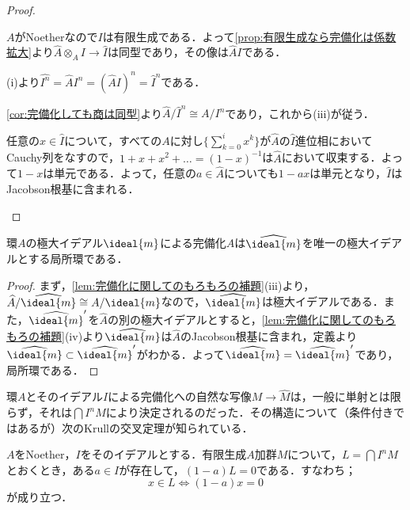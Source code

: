 \begin{proof}
	\begin{sakura}
		\item $A$がNoetherなので$I$は有限生成である．よって\ref{prop:有限生成なら完備化は係数拡大}より$\widehat{A}\otimes_A I\to\widehat{I}$は同型であり，その像は$\widehat{A}I$である．
		
		\item (i)より$\widehat{I^n}=\widehat{A}I^n=(\widehat{A}I)^n=\widehat{I}^n$である．
		
		\item \ref{cor:完備化しても商は同型}より$\widehat{A}/\widehat{I}^n\cong A/I^n$であり，これから(iii)が従う．
		
		\item 任意の$x\in\widehat{I}$について，すべての$A$に対し$\{\sum_{k=0}^i x^k\}$が$\widehat{A}$の$\widehat{I}$進位相においてCauchy列をなすので，$1+x+x^2+\dots=(1-x)^{-1}$は$\widehat{A}$において収束する．よって$1-x$は単元である．よって，任意の$a\in\widehat{A}$についても$1-ax$は単元となり，$\widehat{I}$はJacobson根基に含まれる．
	\end{sakura}
\end{proof}

\begin{prop}
	環$A$の極大イデアル$\ideal{m}$による完備化$\widehat{A}$は$\widehat{\ideal{m}}$を唯一の極大イデアルとする局所環である．
\end{prop}

\begin{proof}
	まず，\ref{lem:完備化に関してのもろもろの補題}(iii)より，$\widehat{A}/\widehat{\ideal{m}}\cong A/\ideal{m}$なので，$\widehat{\ideal{m}}$は極大イデアルである．また，$\widehat{\ideal{m}}'$を$\widehat{A}$の別の極大イデアルとすると，\ref{lem:完備化に関してのもろもろの補題}(iv)より$\widehat{\ideal{m}}$は$\widehat{A}$のJacobson根基に含まれ，定義より$\widehat{\ideal{m}}\subset\widehat{\ideal{m}}'$がわかる．よって$\widehat{\ideal{m}}=\widehat{\ideal{m}}'$であり，局所環である．
\end{proof}

環$A$とそのイデアル$I$による完備化への自然な写像$M\to\widehat{M}$は，一般に単射とは限らず，それは$\bigcap I^nM$により決定されるのだった．その構造について（条件付きではあるが）次のKrullの交叉定理が知られている．

\begin{thm}[Krullの交叉定理]
	$A$をNoether，$I$をそのイデアルとする．有限生成$A$加群$M$について，$L=\bigcap I^nM$とおくとき，ある$a\in I$が存在して，$(1-a)L=0$である．すなわち；
	\[x\in L\Longleftrightarrow (1-a)x=0\]
	が成り立つ．
\end{thm}

